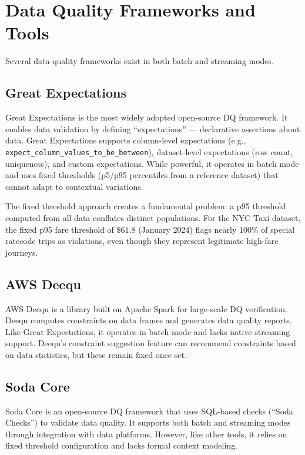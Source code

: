 \section{Data Quality Frameworks and Tools}

Several data quality frameworks exist in both batch and streaming modes.

\subsection{Great Expectations}

Great Expectations \citep{great_expectations} is the most widely adopted open-source DQ framework. It enables data validation by defining ``expectations'' --- declarative assertions about data. Great Expectations supports column-level expectations (e.g., \texttt{expect\_column\_values\_to\_be\_between}), dataset-level expectations (row count, uniqueness), and custom expectations. While powerful, it operates in batch mode and uses fixed thresholds (p5/p95 percentiles from a reference dataset) that cannot adapt to contextual variations.

The fixed threshold approach creates a fundamental problem: a p95 threshold computed from all data conflates distinct populations. For the NYC Taxi dataset, the fixed p95 fare threshold of $\$61.8$ (January 2024) flags nearly 100\% of special ratecode trips as violations, even though they represent legitimate high-fare journeys.

\subsection{AWS Deequ}

AWS Deequ \citep{s察ter2018automating} is a library built on Apache Spark for large-scale DQ verification. Deequ computes constraints on data frames and generates data quality reports. Like Great Expectations, it operates in batch mode and lacks native streaming support. Deequ's constraint suggestion feature can recommend constraints based on data statistics, but these remain fixed once set.

\subsection{Soda Core}

Soda Core \citep{sodacore2024} is an open-source DQ framework that uses SQL-based checks (``Soda Checks'') to validate data quality. It supports both batch and streaming modes through integration with data platforms. However, like other tools, it relies on fixed threshold configuration and lacks formal context modeling.

